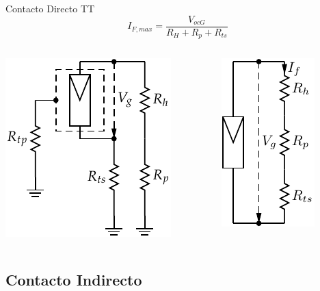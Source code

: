 \documentclass[xcolor={usenames,svgnames,dvipsnames}]{beamer}
\begin{document}
\begin{frame}[label={sec:orgc0dcedf}]{Contacto Directo TT}
$$I_{F,max}=\frac{V_{ocG}}{R_{H}+R_{p}+R_{ts}}$$

\begin{columns}
\begin{column}{0.5\columnwidth}
\begin{center}
\includegraphics[height=0.5\textheight]{../figs/ContactoDirectoTT.pdf}
\end{center}
\end{column}

\begin{column}{0.5\columnwidth}
\begin{center}
\includegraphics[height=0.5\textheight]{../figs/ContactoDirectoTT_simple.pdf}
\end{center}
\end{column}
\end{columns}
\end{frame}




\subsection{Contacto Indirecto}
\label{sec:org54cecc5}
\end{document}
